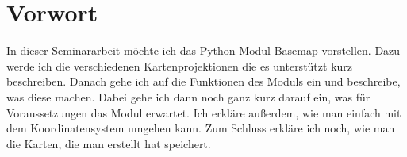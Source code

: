 \section{Vorwort}
\label{sec:vor}
In dieser Seminararbeit möchte ich das Python Modul \textsf{Basemap} vorstellen. Dazu werde ich die verschiedenen Kartenprojektionen die es unterstützt kurz beschreiben. Danach gehe ich auf die Funktionen des Moduls ein und beschreibe, was diese machen. Dabei gehe ich dann noch ganz kurz darauf ein, was für Voraussetzungen das Modul erwartet. Ich erkläre außerdem, wie man einfach mit dem Koordinatensystem umgehen kann. Zum Schluss erkläre ich noch, wie man die Karten, die man erstellt hat speichert.
